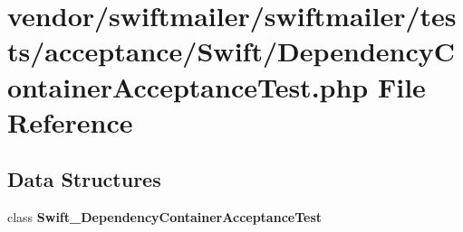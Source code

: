 \section{vendor/swiftmailer/swiftmailer/tests/acceptance/\+Swift/\+Dependency\+Container\+Acceptance\+Test.php File Reference}
\label{_dependency_container_acceptance_test_8php}
\subsection*{Data Structures}
\begin{DoxyCompactItemize}
\item 
class {\bf Swift\+\_\+\+Dependency\+Container\+Acceptance\+Test}
\end{DoxyCompactItemize}
